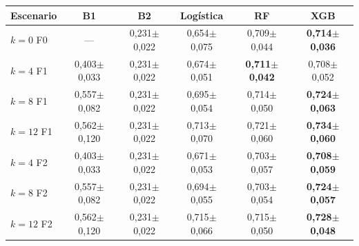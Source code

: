 \begin{tabular}{@{}lccccc@{}}
\toprule
Escenario & B1 & B2 & Logística & RF & XGB \\
\midrule
$k=0$ F0 & — & 0,231$\pm$0,022 & 0,654$\pm$0,075 & 0,709$\pm$0,044 & \textbf{0,714$\pm$0,036} \\
$k=4$ F1 & 0,403$\pm$0,033 & 0,231$\pm$0,022 & 0,674$\pm$0,051 & \textbf{0,711$\pm$0,042} & 0,708$\pm$0,052 \\
$k=8$ F1 & 0,557$\pm$0,082 & 0,231$\pm$0,022 & 0,695$\pm$0,054 & 0,714$\pm$0,050 & \textbf{0,724$\pm$0,063} \\
$k=12$ F1 & 0,562$\pm$0,120 & 0,231$\pm$0,022 & 0,713$\pm$0,070 & 0,721$\pm$0,060 & \textbf{0,734$\pm$0,060} \\
$k=4$ F2 & 0,403$\pm$0,033 & 0,231$\pm$0,022 & 0,671$\pm$0,053 & 0,703$\pm$0,057 & \textbf{0,708$\pm$0,059} \\
$k=8$ F2 & 0,557$\pm$0,082 & 0,231$\pm$0,022 & 0,694$\pm$0,055 & 0,703$\pm$0,054 & \textbf{0,724$\pm$0,057} \\
$k=12$ F2 & 0,562$\pm$0,120 & 0,231$\pm$0,022 & 0,715$\pm$0,066 & 0,715$\pm$0,050 & \textbf{0,728$\pm$0,048} \\
\bottomrule
\end{tabular}
